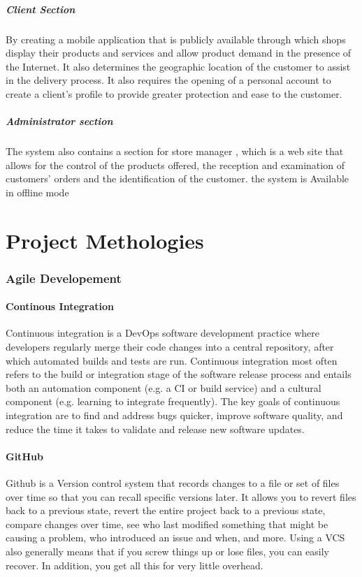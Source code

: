 \documentclass{article}
\begin{document}
\subsubsection{Client Section}
By creating a mobile application that is publicly available through which shops display their products and services and allow product demand in the presence of the Internet. It also determines the geographic location of the customer to assist in the delivery process. It also requires the opening of a personal account to create a client's profile to provide greater protection and ease to the customer.
\subsubsection{Administrator section}
The system also contains a section for store manager , which is a web site that allows for the control of the products offered, the reception and examination of customers' orders and the identification of the customer.
the system is Available in offline mode
\part{Project Methologies}
\section{Agile Developement}
\subsection{Continous Integration}
Continuous integration is a DevOps software development practice where developers regularly merge their code changes into a central repository, after which automated builds and tests are run. Continuous integration most often refers to the build or integration stage of the software release process and entails both an automation component (e.g. a CI or build service) and a cultural component (e.g. learning to integrate frequently). The key goals of continuous integration are to find and address bugs quicker, improve software quality, and reduce the time it takes to validate and release new software updates.
\subsection{GitHub}
Github is a Version control system that records changes to a file or set of files over time so that you can recall specific versions later.
It allows you to revert files back to a previous state, revert the entire project back to a previous state, compare changes over time, see who last modified something that might be
causing a problem, who introduced an issue and when, and more. Using a VCS also generally
means that if you screw things up or lose files, you can easily recover. In addition, you get all this for very little overhead.
\end{document}

